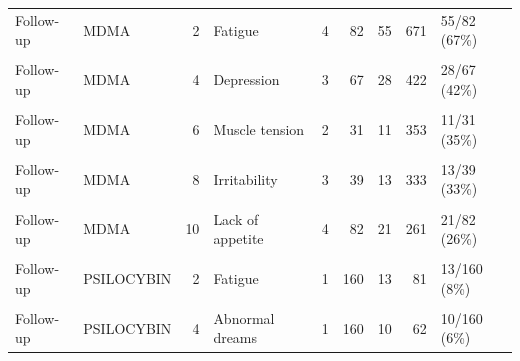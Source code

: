 \begin{table}[!h]
{\begin{tabular}[t]{llrlrrrrl}
Follow-up & MDMA & 2 & Fatigue & 4 & 82 & 55 & 671 & 55/82 (67\%)\\
\cellcolor{gray!10}{Follow-up} & \cellcolor{gray!10}{MDMA} & \cellcolor{gray!10}{3} & \cellcolor{gray!10}{Depressed mood} & \cellcolor{gray!10}{1} & \cellcolor{gray!10}{8} & \cellcolor{gray!10}{4} & \cellcolor{gray!10}{500} & \cellcolor{gray!10}{4/8 (50\%)}\\
Follow-up & MDMA & 4 & Depression & 3 & 67 & 28 & 422 & 28/67 (42\%)\\
\cellcolor{gray!10}{Follow-up} & \cellcolor{gray!10}{MDMA} & \cellcolor{gray!10}{5} & \cellcolor{gray!10}{Anxiety} & \cellcolor{gray!10}{4} & \cellcolor{gray!10}{82} & \cellcolor{gray!10}{34} & \cellcolor{gray!10}{415} & \cellcolor{gray!10}{34/82 (42\%)}\\
\addlinespace
Follow-up & MDMA & 6 & Muscle tension & 2 & 31 & 11 & 353 & 11/31 (35\%)\\
\cellcolor{gray!10}{Follow-up} & \cellcolor{gray!10}{MDMA} & \cellcolor{gray!10}{7} & \cellcolor{gray!10}{Headache} & \cellcolor{gray!10}{4} & \cellcolor{gray!10}{82} & \cellcolor{gray!10}{28} & \cellcolor{gray!10}{340} & \cellcolor{gray!10}{28/82 (34\%)}\\
Follow-up & MDMA & 8 & Irritability & 3 & 39 & 13 & 333 & 13/39 (33\%)\\
\cellcolor{gray!10}{Follow-up} & \cellcolor{gray!10}{MDMA} & \cellcolor{gray!10}{9} & \cellcolor{gray!10}{Decreased concentration} & \cellcolor{gray!10}{4} & \cellcolor{gray!10}{75} & \cellcolor{gray!10}{22} & \cellcolor{gray!10}{292} & \cellcolor{gray!10}{22/75 (29\%)}\\
Follow-up & MDMA & 10 & Lack of appetite & 4 & 82 & 21 & 261 & 21/82 (26\%)\\
\addlinespace
\cellcolor{gray!10}{Follow-up} & \cellcolor{gray!10}{PSILOCYBIN} & \cellcolor{gray!10}{1} & \cellcolor{gray!10}{Headache} & \cellcolor{gray!10}{1} & \cellcolor{gray!10}{160} & \cellcolor{gray!10}{60} & \cellcolor{gray!10}{375} & \cellcolor{gray!10}{60/160 (38\%)}\\
Follow-up & PSILOCYBIN & 2 & Fatigue & 1 & 160 & 13 & 81 & 13/160 (8\%)\\
\cellcolor{gray!10}{Follow-up} & \cellcolor{gray!10}{PSILOCYBIN} & \cellcolor{gray!10}{3} & \cellcolor{gray!10}{Anxiety} & \cellcolor{gray!10}{1} & \cellcolor{gray!10}{160} & \cellcolor{gray!10}{11} & \cellcolor{gray!10}{69} & \cellcolor{gray!10}{11/160 (7\%)}\\
Follow-up & PSILOCYBIN & 4 & Abnormal dreams & 1 & 160 & 10 & 62 & 10/160 (6\%)\\

\end{tabular}}
\end{table}
